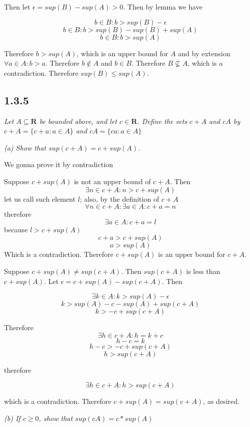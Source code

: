 \documentclass[11pt,oneside,titlepage]{book}
\begin{document}
Then let $\epsilon = sup(B) - sup(A) > 0$. Then by lemma we have

$$b \in B: b > sup(B) - \epsilon$$
$$b \in B: b > sup(B) - sup(B) + sup(A)$$
$$b \in B: b > sup(A)$$

Therefore $b > sup(A)$, which is an upper bound for $A$ and by extension
$\forall a \in A: b > a$. Therefore $b \notin A$ and $b \in B$. Therefore
$B \not\subseteq A$, which is a contradiction. Therefore $sup(B) \leq sup(A)$.

\subsection*{1.3.5}
\textit{Let $A \subseteq \textbf{R}$ be bounded above, and let $c \in
  \textbf{R}$. Define the sets $c + A$ and $cA$ by $c + A = \{c + a: a \in A\}$
  and  $cA = \{ca: a \in A\}$
}

\textit{(a) Show that $sup(c + A) = c + sup(A)$.}


We gonna prove it by contradiction

Suppose $c + sup(A)$ is not an upper bound of $c + A$. Then
$$\exists n \in c + A: n > c + sup(A)$$
let us call such element $l$;
also, by the definition of $c + A$
$$\forall n \in c + A : \exists a \in A: c + a = n$$
therefore
$$\exists a \in A: c + a = l$$
because $l > c + sup(A)$
$$c + a > c + sup(A)$$
$$a > sup(A)$$
Which is a contradiction. Therefore $c + sup(A)$ is an upper bound for $c + A$.

Suppose $c + sup(A) \neq sup(c + A)$. Then $sup(c + A)$ is less
than $c + sup(A)$. Let $\epsilon = c + sup(A) - sup(c + A)$. Then

$$\exists k \in A: k > sup(A) - \epsilon$$
$$k > sup(A) - c - sup(A) + sup(c + A)$$
$$k > - c  + sup(c + A)$$

Therefore
$$\exists h \in c + A: h = k + c$$
$$h - c = k$$
$$h - c >  -c + sup(c + A)$$
$$h > sup(c + A)$$

therefore

$$\exists h \in c + A: h > sup(c + A)$$

which is a contradiction. Therefore $c + sup(A) = sup(c + A)$, as desired.

\textit{(b) If $c \geq 0$, show that $sup(cA) = c * sup(A)$}
\end{document}
